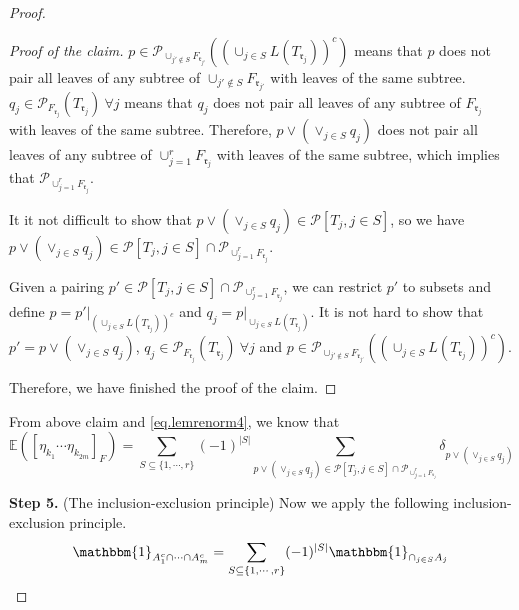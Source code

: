 \begin{proof}
 \begin{proof}[Proof of the claim] $p\in \mathcal{P}_{\cup_{j'\notin S} F_{\mathfrak{r}_{j'}}}((\cup_{j\in S}L(T_{\mathfrak{r}_j}))^c)$ means that $p$ does not pair all leaves of any subtree of $\cup_{j'\notin S} F_{\mathfrak{r}_{j'}}$ with leaves of the same subtree. $q_j\in 
 \mathcal{P}_{F_{\mathfrak{r}_j}}(T_{\mathfrak{r}_j})\ \forall j$ means that $q_j$ does not pair all leaves of any subtree of $F_{\mathfrak{r}_j}$ with leaves of the same subtree. Therefore, $p\vee (\vee_{j\in S} q_j)$ does not pair all leaves of any subtree of $\cup_{j=1}^r F_{\mathfrak{r}_{j}}$ with leaves of the same subtree, which implies that $\mathcal{P}_{\cup_{j=1}^r F_{\mathfrak{r}_{j}}}$.
 
 It it not difficult to show that $p\vee (\vee_{j\in S} q_j)\in \mathcal{P}[T_j,j\in S]$, so we have $p\vee (\vee_{j\in S} q_j)\in \mathcal{P}[T_j,j\in S]\cap \mathcal{P}_{\cup_{j=1}^r F_{\mathfrak{r}_{j}}}$.
 
 Given a pairing $p'\in \mathcal{P}[T_j,j\in S]\cap \mathcal{P}_{\cup_{j=1}^r F_{\mathfrak{r}_{j}}}$, we can restrict $p'$ to subsets and define $p = p'|_{(\cup_{j\in S}L(T_{\mathfrak{r}_j}))^c}$ and $q_j = p|_{\cup_{j\in S}L(T_{\mathfrak{r}_j})}$. It is not hard to show that $p'=p\vee (\vee_{j\in S} q_j)$, $q_j\in 
 \mathcal{P}_{F_{\mathfrak{r}_j}}(T_{\mathfrak{r}_j})\ \forall j$ and $p\in \mathcal{P}_{\cup_{j'\notin S} F_{\mathfrak{r}_{j'}}}((\cup_{j\in S}L(T_{\mathfrak{r}_j}))^c)$.
 
 Therefore, we have finished the proof of the claim.
 \end{proof}
 
 From above claim and \eqref{eq.lemrenorm4}, we know that 
 \begin{equation}
  \mathbb{E}([\eta_{k_1}\cdots \eta_{k_{2m}}]_F)=\sum_{S\subseteq\{1,\cdots,r\}}(-1)^{|S|}\sum_{p\vee (\vee_{j\in S} q_j)\in \mathcal{P}[T_j,j\in S]\cap \mathcal{P}_{\cup_{j=1}^r F_{\mathfrak{r}_{j}}}} 
  \delta_{p\vee (\vee_{j\in S} q_j)}
 \end{equation}
  
 
 \textbf{Step 5.} (The inclusion-exclusion principle) Now we apply the following inclusion-exclusion principle.
 \begin{equation}\label{eq.inclu-exclu}
  \mathbbm{1}_{A_1^c\cap\cdots\cap A_m^c} = \sum_{S\subseteq\{1,\cdots,r\}}(-1)^{|S|} \mathbbm{1}_{\cap_{j\in S} A_j}
 \end{equation}
 

\end{proof}
